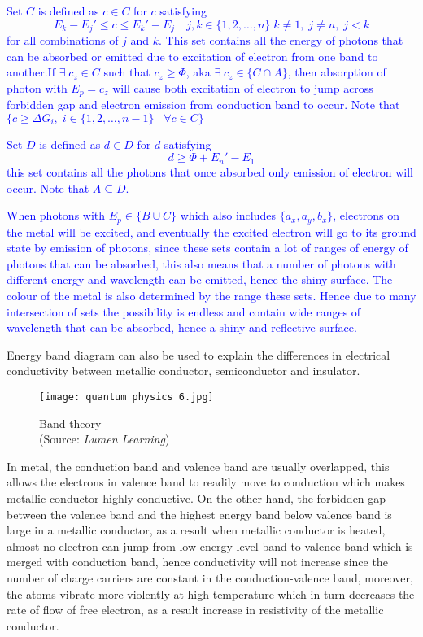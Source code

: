 \documentclass{article}
\begin{document}
\textcolor{blue}{Set $C$ is defined as $c\in C$ for $c$ satisfying 
$$E_k-{E_j}' \leq c \leq {E_k}'-E_j \quad j,k\in \{1,2,\dots,n\} \; k\neq 1, \; j \neq n, \; j < k$$
for all combinations of $j$ and $k$. This set contains all the energy of photons that can be absorbed or emitted due to excitation of electron from one band to another.If $\exists \; c_z \in C$ such that $c_z\geq \Phi$, aka $\exists \; c_z\in \{C\cap A\}$, then absorption of photon with $E_p=c_z$ will cause both excitation of electron to jump across forbidden gap and electron emission from conduction band to occur. Note that $\{c \geq \Delta G_i ,\; i\in \{1,2,\dots,n-1\} \;|\; \forall c\in C \}$ }

\textcolor{blue}{Set $D$ is defined as $d\in D$ for $d$ satisfying
$$d \geq \Phi + {E_n}'-E_1$$
this set contains all the photons that once absorbed only emission of electron will occur. Note that $A\subseteq D$.}

\textcolor{blue}{When photons with $E_p\in \{B \cup C\}$ which also includes $\{a_x, a_y, b_x\}$, electrons on the metal will be excited, and eventually the excited electron will go to its ground state by emission of photons, since these sets contain a lot of ranges of energy of photons that can be absorbed, this also means that a number of photons with different energy and wavelength can be emitted, hence the shiny surface. The colour of the metal is also determined by the range these sets. Hence due to many intersection of sets the possibility is endless and contain wide ranges of wavelength that can be absorbed, hence a shiny and reflective surface.}

Energy band diagram can also be used to explain the differences in electrical conductivity between metallic conductor, semiconductor and insulator.
\begin{figure}[H]
    \centering
    \captionsetup{justification=centering,margin=2cm}
    \texttt{[image: quantum physics 6.jpg]}
    \caption*{Band theory \\ (Source: \textit{Lumen Learning})}
\end{figure}
In metal, the conduction band and valence band are usually overlapped, this allows the electrons in valence band to readily move to conduction which makes metallic conductor highly conductive. On the other hand, the forbidden gap between the valence band and the highest energy band below valence band is large in a metallic conductor, as a result when metallic conductor is heated, almost no electron can jump from low energy level band to valence band which is merged with conduction band, hence conductivity will not increase since the number of charge carriers are constant in the conduction-valence band, moreover, the atoms vibrate more violently at high temperature which in turn decreases the rate of flow of free electron, as a result increase in resistivity  of the metallic conductor.
\end{document}
